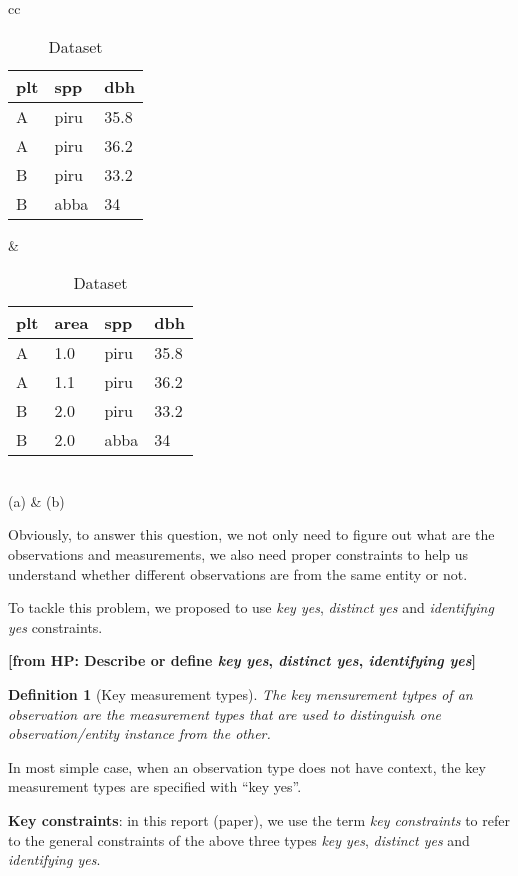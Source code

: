 \documentclass[10pt]{article}
\newtheorem{definition}{Definition}[section]
\newcommand{\from}[2]{{\bf[{\sc from #1:} #2]}}
\begin{document}
\begin{table}[htb]
\begin{center}
\begin{tabular}{cc}
\begin{tabular}{|l|l|l|}
\hline
plt & spp & dbh\\\hline
A & piru & 35.8 \\\hline
A & piru & 36.2 \\\hline
B & piru &33.2 \\\hline
B&abba&34\\\hline
\end{tabular}
&
\begin{tabular}{|l|l|l|l|}
\hline
plt & area & spp & dbh\\\hline
A & 1.0 & piru & 35.8 \\\hline
A & 1.1 & piru & 36.2 \\\hline
B & 2.0 &piru &33.2 \\\hline
B& 2.0 & abba&34\\\hline
\end{tabular}\\
(a) & (b)
\end{tabular}
\end{center}
\vspace{-0.2in}
\caption{Dataset}
\label{tb:pltarea}
\end{table}


Obviously, to answer this question, we not only need to figure out
what are the observations and measurements, we also need proper
constraints to help us understand whether different observations are
from the same entity or not. 

To tackle this problem, we proposed to use {\em key yes}, {\em
  distinct yes} and {\em identifying yes} constraints. 

\from{HP} {Describe or define {\em key yes},  {\em distinct yes},  {\em identifying yes}}

\begin{definition}[Key measurement types]{
The key mensurement tytpes of an observation are the measurement types
that are used to distinguish one observation/entity instance from the
other. }
\end{definition}
In most simple case, when an observation type does not have context, 
the key measurement types are specified with ``key yes''. 

{\bf Key constraints}: in this report (paper),  we use the term {\em
  key constraints} to refer to the general constraints of the above
three types {\em key yes}, {\em distinct yes} and 
{\em identifying yes}. 
\end{document}
